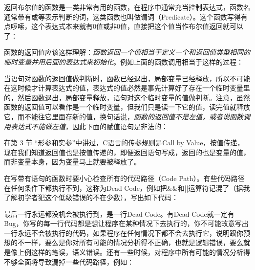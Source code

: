 返回布尔值的函数是一类非常有用的函数，在程序中通常充当控制表达式，函数名通常带有或等表示判断的词，这类函数也叫做谓词（Predicate）。这个函数写得有点啰嗦，这个表达式本来就有0值或非0值，直接把这个值当作布尔值返回就可以了：




函数的返回值应该这样理解：\emph{函数返回一个值相当于定义一个和返回值类型相同的临时变量并用后面的表达式来初始化}。例如上面的函数调用相当于这样的过程：




当语句对函数的返回值做判断时，函数已经退出，局部变量已经释放，所以不可能在这时候才计算表达式的值，表达式的值必然是事先计算好了存在一个临时变量里的，然后函数退出，局部变量释放，语句对这个临时变量的值做判断。注意，虽然函数的返回值可以看作是一个临时变量，但我们只是读一下它的值，读完值就释放它，而不能往它里面存新的值，换句话说，\emph{函数的返回值不是左值，或者说函数调用表达式不能做左值}，因此下面的赋值语句是非法的：




在\hyperlink{db.ch03s03.id2713785}{第 3 节 “形参和实参”}中讲过，C语言的传参规则是Call by Value，按值传递，现在我们知道返回值也是按值传递的，即便返回语句写成，返回的也是变量的值，而非变量本身，因为变量马上就要被释放了。



在写带有语句的函数时要小心检查所有的代码路径（Code Path）。有些代码路径在任何条件下都执行不到，这称为Dead Code，例如把\&\&和||运算符记混了（据我了解初学者犯这个低级错误的不在少数），写出如下代码：




最后一行永远都没机会被执行到，是一行Dead Code。有Dead Code就一定有Bug，你写的每一行代码都是想让程序在某种情况下去执行的，你不可能故意写出一行永远不会被执行的代码，如果程序在任何情况下都不会去执行它，说明跟你预想的不一样，要么是你对所有可能的情况分析得不正确，也就是逻辑错误，要么就是像上例这样的笔误，语义错误。还有一些时候，对程序中所有可能的情况分析得不够全面将导致漏掉一些代码路径，例如：


